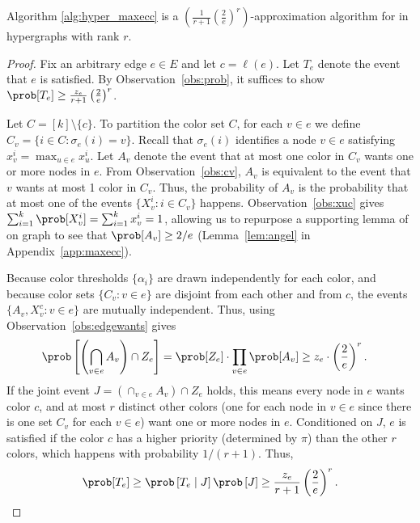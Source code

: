 \begin{theorem}
	\label{thm:hypermaxecc}
	Algorithm \ref{alg:hyper_maxecc} is a $\left(\frac{1}{r+1} \left(\frac{2}{e}\right)^r\right)$-approximation algorithm for \maxecc{} in hypergraphs with rank $r$.
\end{theorem}
\begin{proof}
	Fix an arbitrary edge $e \in E$ and let $c = \ell(e)$. Let $T_e$ denote the event that $e$ is satisfied.
	By Observation~\ref{obs:prob}, it suffices to show $\prob[T_e] \geq \frac{z_e}{r+1} \left(\frac2e\right)^r$.

	Let $C = [k]\setminus \{c\}$.
	To partition the color set $C$, for each $v \in e$ we define
	$C_v = \{i \in C \colon \sigma_e(i) = v\}$.
	Recall that $\sigma_e(i)$ identifies a node $v \in e$ satisfying $x_v^i = \max_{u \in e} x_u^i$.
	Let $A_v$ denote the event that at most one color in $C_v$ wants one or more nodes in $e$. From Observation~\ref{obs:cv}, $A_v$ is equivalent to the event that  $v$ wants at most 1 color in $C_v$. Thus, the probability of $A_v$ is the probability that at most one of the events $\{X_v^i \colon i \in C_v \}$ happens. Observation~\ref{obs:xuc} gives $\sum_{i = 1}^k \prob[X_v^i] = \sum_{i = 1}^k x_v^i = 1$, allowing us to repurpose a supporting lemma of~\citet{angel2016clustering} on graph \maxecc{} to see that $\prob[A_v] \geq 2/e$ (Lemma~\ref{lem:angel} in Appendix~\ref{app:maxecc}).

	Because color thresholds $\{\alpha_i\}$ are drawn independently for each color, and because color sets $\{C_v \colon v \in e\}$ are disjoint from each other and from $c$, the events $\{A_v, X_v^c \colon v \in e\}$ are mutually independent.
	Thus, using Observation~\ref{obs:edgewants} gives
	\begin{align*}
		\prob\left[ \left(\bigcap_{v \in e} A_v \right) \cap Z_e\right ] & = \prob[Z_e]\cdot \prod_{v \in e} \prob[A_v] \geq z_e \cdot \left(\frac2e \right)^r.
	\end{align*}
	If the joint event $J = (\cap_{v \in e} A_v) \cap Z_e$ holds, this means every node in $e$ wants color $c$, and at most $r$ distinct other colors (one for each node in $v \in e$ since there is one set $C_v$ for each $v \in e$) want one or more nodes in $e$. Conditioned on $J$, $e$ is satisfied if the color $c$ has a higher priority (determined by $\pi$) than the other $r$ colors, which happens with probability $1/(r+1)$. Thus,
	\begin{align*}
		{	\prob[T_e] \geq \prob\left[T_e \mid J\right] \prob\left[ J \right] \geq \frac{z_e}{r+1}\left(\frac2e\right)^r.}
	\end{align*}
\end{proof}

